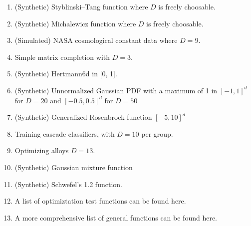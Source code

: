 \begin{enumerate}
\item \citep{Gardner2017} (Synthetic) Styblinski–Tang function where $D$ is freely choosable.
\item \citep{Gardner2017} (Synthetic) Michalewicz function where $D$ is freely choosable.
\item \citep{Gardner2017} (Simulated) NASA cosmological constant data where $D=9$.
\item \citep{Gardner2017} Simple matrix completion with $D=3$.
\item \citep{Rana2017} (Synthetic) Hertmann6d in [0, 1].
\item \citep{Rana2017} (Synthetic) Unnormalized Gaussian PDF with a maximum of 1 in $[-1, 1]^d$ for $D=20$ and $[-0.5, 0.5]^d$ for $D=50$
\item \citep{Rana2017} (Synthetic) Generalized Rosenbrock function $[-5, 10]^d$
\item \citep{Rana2017} Training cascade classifiers, with $D=10$ per group.
\item \citep{Rana2017} Optimizing alloys $D=13$. 
\item \citep{Li2018} (Synthetic) Gaussian mixture function
\item \citep{Li2018} (Synthetic) Schwefel's 1.2 function.
\item \citep{OptimizationTestFunctions} A list of optimiztation test functions can be found here.
\item \citep{Jamil2013} A more comprehensive list of general functions can be found here.
\end{enumerate}
